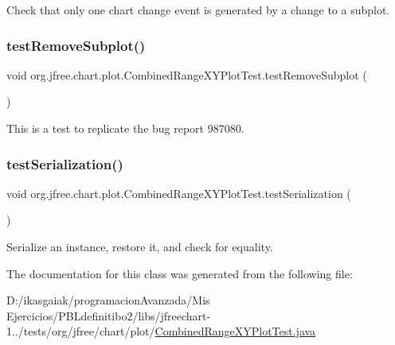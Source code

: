 Check that only one chart change event is generated by a change to a subplot. \mbox{\label{classorg_1_1jfree_1_1chart_1_1plot_1_1_combined_range_x_y_plot_test_af9bcc26a57f13788c5c6ae8b7765a771}} 
\subsubsection{\texorpdfstring{test\+Remove\+Subplot()}{testRemoveSubplot()}}
{\footnotesize\ttfamily void org.\+jfree.\+chart.\+plot.\+Combined\+Range\+X\+Y\+Plot\+Test.\+test\+Remove\+Subplot (\begin{DoxyParamCaption}{ }\end{DoxyParamCaption})}

This is a test to replicate the bug report 987080. \mbox{\label{classorg_1_1jfree_1_1chart_1_1plot_1_1_combined_range_x_y_plot_test_a042ebe184e02c6ed021d931fe9dcca08}} 
\subsubsection{\texorpdfstring{test\+Serialization()}{testSerialization()}}
{\footnotesize\ttfamily void org.\+jfree.\+chart.\+plot.\+Combined\+Range\+X\+Y\+Plot\+Test.\+test\+Serialization (\begin{DoxyParamCaption}{ }\end{DoxyParamCaption})}

Serialize an instance, restore it, and check for equality. 

The documentation for this class was generated from the following file\+:\begin{DoxyCompactItemize}
\item 
D\+:/ikasgaiak/programacion\+Avanzada/\+Mis Ejercicios/\+P\+B\+Ldefinitibo2/libs/jfreechart-\/1../tests/org/jfree/chart/plot/\mbox{\hyperlink{_combined_range_x_y_plot_test_8java}{Combined\+Range\+X\+Y\+Plot\+Test.\+java}}\end{DoxyCompactItemize}
